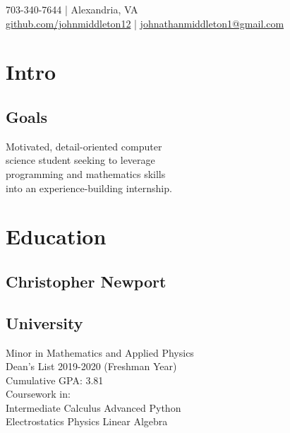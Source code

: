 \documentclass[]{deedy-resume-openfont}
\begin{document}
%
%


%
%

{ 
703-340-7644 | Alexandria, VA \\
\href{https://www.github.com/johnmiddleton12}{github.com/johnmiddleton12} | 
\href{mailto:johnathanmiddleton1@gmail.com}{johnathanmiddleton1@gmail.com}
}

%
%

\begin{minipage}[t]{0.33\textwidth} 



\section{Intro}
\subsection{Goals}
Motivated, detail-oriented computer \\
science student seeking to leverage \\
programming and mathematics skills \\
into an experience-building internship.

\sectionsep


\section{Education} 

\subsection{Christopher Newport}
\subsection{University}
Minor in Mathematics and Applied Physics \\
Dean's List 2019-2020 (Freshman Year) \\
Cumulative GPA: 3.81 \\
{Coursework in:} \\
Intermediate Calculus \textbullet{} Advanced Python \\
Electrostatics Physics \textbullet{} Linear Algebra\\
\sectionsep


\end{minipage}
\end{document}
